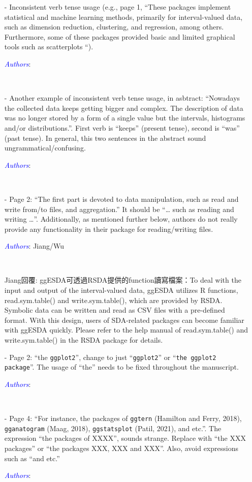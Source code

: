 \documentclass[11pt]{article}
\newcommand{\authors}[1]{

 \parbox{15cm}{\textcolor{blue}{\it Authors}: \color{red}#1}
 \\ \vspace{0.3cm}
}
\begin{document}
\begin{itemize}
\item[-] Inconsistent verb tense usage (e.g., page 1, “These packages implement statistical and machine learning methods, primarily for interval-valued data, such as dimension reduction, clustering, and regression, among others. Furthermore, some of these packages provided basic and limited graphical tools such as scatterplots “). 
\authors{

}


\item[-] Another example of inconsistent verb tense usage, in asbtract: “Nowadays the collected data keeps getting bigger and complex. The description of data was no longer stored by a form of a single value but the intervals, histograms and/or distributions.”. First verb is “keeps” (present tense), second is “was” (past tense). In general, this two sentences in the abstract sound ungrammatical/confusing. 
\authors{

}


\item[-] Page 2: “The first part is devoted to data manipulation, such as read and write from/to files, and aggregation.” It should be “… such as reading and writing …”. Additionally, as mentioned further below, authors do not really provide any functionality in their package for reading/writing files. 
\authors{Jiang/Wu

}
Jiang回覆: ggESDA可透過RSDA提供的function讀寫檔案：To deal with the input and output of the interval-valued data, ggESDA utilizes R functions, read.sym.table() and write.sym.table(), which are provided by RSDA. Symbolic data can be written and read as CSV files with a pre-defined format. With this design, users of SDA-related packages can become familiar with ggESDA quickly. Please refer to the help manual of read.sym.table() and write.sym.table() in the RSDA package for details.


\item[-] Page 2: “the {\tt ggplot2}”, change to just “{\tt ggplot2}” or “{\tt the ggplot2 package}”. The usage of “the” needs to be fixed throughout the manuscript. 
\authors{

}


\item[-] Page 4: “For instance, the packages of {\tt ggtern} (Hamilton and Ferry, 2018), {\tt gganatogram} (Maag, 2018), {\tt ggstatsplot} (Patil, 2021), and etc.”. The expression “the packages of XXXX”, sounds strange. Replace with “the XXX packages” or “the packages XXX, XXX and XXX”. Also, avoid expressions such as “and etc.” 
\authors{

}
\end{itemize}
\end{document}
